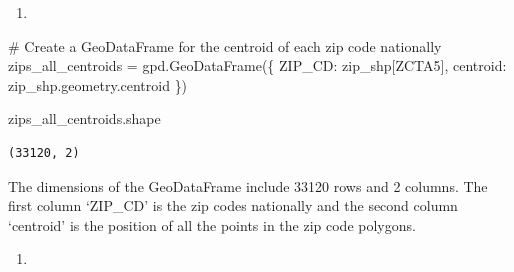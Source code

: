 \documentclass[
  letterpaper,
  DIV=11,
  numbers=noendperiod]{scrartcl}
\newenvironment{Shaded}{\begin{snugshade}}{\end{snugshade}}
\newcommand{\CommentTok}[1]{\textcolor[rgb]{0.37,0.37,0.37}{#1}}
\newcommand{\NormalTok}[1]{\textcolor[rgb]{0.00,0.23,0.31}{#1}}
\newcommand{\OperatorTok}[1]{\textcolor[rgb]{0.37,0.37,0.37}{#1}}
\newcommand{\StringTok}[1]{\textcolor[rgb]{0.13,0.47,0.30}{#1}}
\providecommand{\tightlist}{%
  \setlength{\itemsep}{0pt}\setlength{\parskip}{0pt}}\usepackage{longtable,booktabs,array}
\begin{document}
\begin{enumerate}
\def\labelenumi{\arabic{enumi}.}
\tightlist
\item
\end{enumerate}

\begin{Shaded}
\begin{Highlighting}[]
\CommentTok{\#  Create a GeoDataFrame for the centroid of each zip code nationally}
\NormalTok{zips\_all\_centroids }\OperatorTok{=}\NormalTok{ gpd.GeoDataFrame(\{}
    \StringTok{\textquotesingle{}ZIP\_CD\textquotesingle{}}\NormalTok{: zip\_shp[}\StringTok{\textquotesingle{}ZCTA5\textquotesingle{}}\NormalTok{],}
    \StringTok{\textquotesingle{}centroid\textquotesingle{}}\NormalTok{: zip\_shp.geometry.centroid}
\NormalTok{\})}

\NormalTok{zips\_all\_centroids.shape}
\end{Highlighting}
\end{Shaded}

\begin{verbatim}
(33120, 2)
\end{verbatim}

The dimensions of the GeoDataFrame include 33120 rows and 2 columns. The
first column `ZIP\_CD' is the zip codes nationally and the second column
`centroid' is the position of all the points in the zip code polygons.

\begin{enumerate}
\def\labelenumi{\arabic{enumi}.}
\setcounter{enumi}{1}
\tightlist
\item
\end{enumerate}
\end{document}
